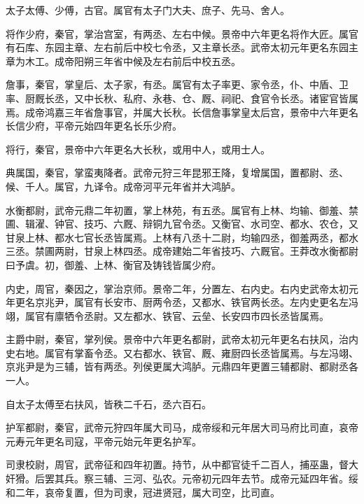\documentclass[12pt,UTF8]{ctexbook}
\begin{document}
太子太傅、少傅，古官。属官有太子门大夫、庶子、先马、舍人。



将作少府，秦官，掌治宫室，有两丞、左右中候。景帝中六年更名将作大匠。属官有石库、东园主章、左右前后中校七令丞，又主章长丞。武帝太初元年更名东园主章为木工。成帝阳朔三年省中候及左右前后中校五丞。



詹事，秦官，掌皇后、太子家，有丞。属官有太子率更、家令丞，仆、中盾、卫率、厨厩长丞，又中长秋、私府、永巷、仓、厩、祠祀、食官令长丞。诸宦官皆属焉。成帝鸿嘉三年省詹事官，并属大长秋。长信詹事掌皇太后宫，景帝中六年更名长信少府，平帝元始四年更名长乐少府。



将行，秦官，景帝中六年更名大长秋，或用中人，或用士人。



典属国，秦官，掌蛮夷降者。武帝元狩三年昆邪王降，复增属国，置都尉、丞、候、千人。属官，九译令。成帝河平元年省并大鸿胪。



水衡都尉，武帝元鼎二年初置，掌上林苑，有五丞。属官有上林、均输、御羞、禁圃、辑濯、钟官、技巧、六厩、辩铜九官令丞。又衡官、水司空、都水、农仓，又甘泉上林、都水七官长丞皆属焉。上林有八丞十二尉，均输四丞，御羞两丞，都水三丞。禁圃两尉，甘泉上林四丞。成帝建始二年省技巧、六厩官。王莽改水衡都尉曰予虞。初，御羞、上林、衡官及铸钱皆属少府。



内史，周官，秦因之，掌治京师。景帝二年，分置左、右内史。右内史武帝太初元年更名京兆尹，属官有长安市、厨两令丞，又都水、铁官两长丞。左内史更名左冯翊，属官有廪牺令丞尉。又左都水、铁官、云垒、长安四市四长丞皆属焉。



主爵中尉，秦官，掌列侯。景帝中六年更名都尉，武帝太初元年更名右扶风，治内史右地。属官有掌畜令丞。又右都水、铁官、厩、雍厨四长丞皆属焉。与左冯翊、京兆尹是为三辅，皆有两丞。列侯更属大鸿胪。元鼎四年更置三辅都尉、都尉丞各一人。



自太子太傅至右扶风，皆秩二千石，丞六百石。



护军都尉，秦官，武帝元狩四年属大司马，成帝绥和元年居大司马府比司直，哀帝元寿元年更名司寇，平帝元始元年更名护军。



司隶校尉，周官，武帝征和四年初置。持节，从中都官徒千二百人，捕巫蛊，督大奸猾。后罢其兵。察三辅、三河、弘农。元帝初元四年去节。成帝元延四年省。绥和二年，哀帝复置，但为司隶，冠进贤冠，属大司空，比司直。
\end{document}
